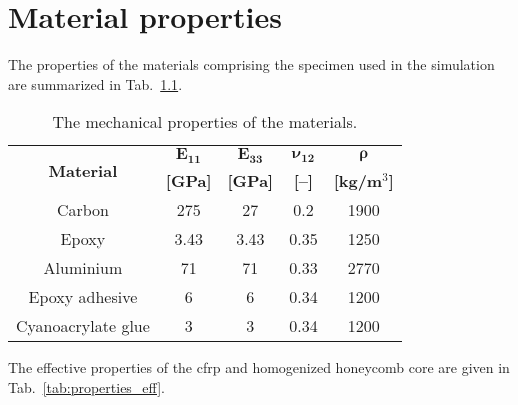 

\chapter{Material properties}
\label{app:properties}

The properties of the materials comprising the specimen used in the simulation are summarized in Tab.~\ref{tab:properties}.
\begin{table}[H]
	\small
	\tabcolsep=0.75cm
	\caption{\label{tab:properties}The mechanical properties of the materials.}
	\begin{tabular}{ccccc}\toprule
		\multirow{2}{*}{\textbf{Material}} & $\boldsymbol{E_{11}}$ & $\boldsymbol{E_{33}}$ & $\boldsymbol{\nu_{12}}$ & $\boldsymbol{\rho}$ \\ & \textbf{[GPa]} &  \textbf{[GPa]} & \textbf{[--]} & \textbf{[kg/m\(^3\)]}\\
		\midrule
		Carbon & 275 & 27 & 0.2 & 1900\\
		Epoxy & 3.43 & 3.43 & 0.35 & 1250\\
		Aluminium & 71 & 71 & 0.33 & 2770\\
		Epoxy adhesive & 6 & 6 & 0.34 & 1200\\
		Cyanoacrylate glue & 3 & 3 & 0.34 & 1200\\		
		\bottomrule
	\end{tabular}
\end{table}
The effective properties of the \ac{cfrp} and homogenized honeycomb core are given in Tab.~\ref{tab:properties_eff}.
\vspace{-12pt}
